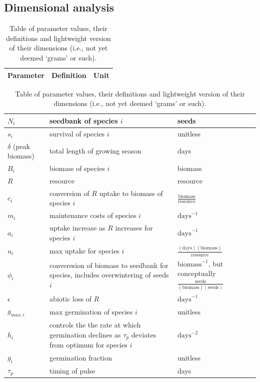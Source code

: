 \documentclass[11pt,letter]{article}
\begin{document}
\subsection{Dimensional analysis}
\begin{center}
\begin{table}[h!]
\caption{Table of parameter values, their definitions and lightweight version of their dimensions (i.e., not yet deemed `grams' or such).}
\begin{tabular}{ | p{3.0cm} | p{6.0cm} | p{4.0cm} |}
\hline 
Parameter & Definition & Unit \\ \hline 
\end{tabular}
\begin{tabular}{ | p{3.0cm} | p{6.0cm} | p{4.0cm} |}
\(N_{i}\) & seedbank of species \(i\) & seeds \\ \hline
\(s_{i}\) & survival of species \(i\) & unitless \\ \hline
\(\delta\) (peak biomass) & total length of growing season & days\\ \hline
\(B_{i}\) & biomass of species \(i\) & biomass \\ \hline
\(R\) & resource & resource\\ \hline
\(c_{i}\) & conversion of \(R\) uptake to biomass of species \(i\) &  \(\frac{\text{biomass}}{\text{resource}}\) \\ \hline
\(m_{i}\) & maintenance costs of species \(i\) & \(\text{days}^{-1}\) \\ \hline
\(a_{i}\) & uptake increase as \(R\) increases for species \(i\) & \(\text{days}^{-1}\) \\ \hline
\(u_{i}\) & max uptake for species \(i\) & \(\frac{(\text{days})(\text{biomass})}{\text{resource}}\) \\ \hline
\(\phi_{i}\) & converesion of biomass to seedbank for species, includes overwintering of seeds \(i\) & \(\text{biomass}^{-1}\), but conceptually \(\frac{\text{seeds}}{(\text{biomass})(\text{seeds})}\) \\ \hline
\(\epsilon\) & abiotic loss of \(R\) &  \(\text{days}^{-1}\) \\ \hline
\(g_{max,i}\) & max germination of species \(i\) & unitless \\ \hline
\(h_{i}\) &  controls the the rate at which germination declines as \(\tau_{p}\) deviates from optimum for species \(i\)  & \(\text{days}^{-2}\) \\ \hline
\(g_{i}\) & germination fraction & unitless \\ \hline
\(\tau_{p}\) & timing of pulse & days \\ \hline

\end{tabular}
\end{table}
\end{center}
\end{document}

